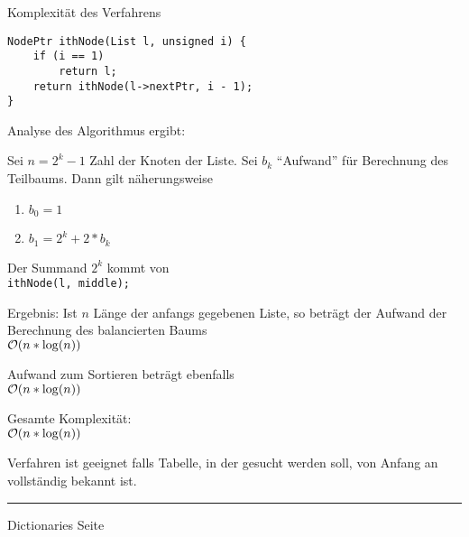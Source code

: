 
\begin{slide}{}
\normalsize

\begin{center}
Komplexit\"at des Verfahrens
\end{center}
\vspace*{0.5cm}

\footnotesize
\begin{verbatim}
NodePtr ithNode(List l, unsigned i) {
    if (i == 1)
        return l;
    return ithNode(l->nextPtr, i - 1);
}
\end{verbatim}
Analyse des Algorithmus ergibt: 

Sei $n = 2^k -1$ Zahl der Knoten der Liste. Sei $b_k$ ``Aufwand'' f\"ur Berechnung des Teilbaums.
Dann gilt n\"aherungsweise 
\begin{enumerate}
\item $b_0 = 1$
\item $b_1 = 2^k + 2 * b_k$
\end{enumerate}
Der Summand $2^k$ kommt von \\[0.3cm]
\hspace*{1.3cm} \texttt{ithNode(l, middle);}

Ergebnis:
Ist $n$ L\"ange der anfangs gegebenen Liste, so betr\"agt der Aufwand der Berechnung des balancierten Baums\\[0.3cm]
\hspace*{1.3cm} $\mathcal{O}(n * \log(n))$

Aufwand zum Sortieren betr\"agt ebenfalls \\[0.3cm]
\hspace*{1.3cm} $\mathcal{O}(n * \log(n))$

Gesamte Komplexit\"at:\\[0.3cm]
\hspace*{1.3cm} $\mathcal{O}(n * \log(n))$

Verfahren ist geeignet falls Tabelle, in der gesucht werden soll,
von Anfang an vollst\"andig bekannt ist.


\vspace*{\fill}
\tiny \addtocounter{mypage}{1}
\rule{17cm}{1mm}
Dictionaries  \hspace*{\fill} Seite 
\end{slide}



